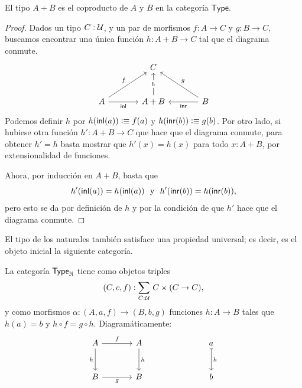 \documentclass[../main.tex]{subfiles}
\begin{document}
\begin{theorem}
  El tipo $A + B$ es el coproducto de $A$ y $B$ en la categor\'ia $\mathsf{Type}$.
\end{theorem}
\begin{proof}
  Dados un tipo $C:\mathcal{U}$, y un par de morfismos $f:A \to C$ y $g:B \to C$, buscamos encontrar una \'unica funci\'on $h: A + B \to C$ tal que el diagrama conmute.
  \[\begin{tikzcd}[row sep=large,column sep=large]
      & C \\
      A & {A+B} & B
      \arrow["f", from=2-1, to=1-2]
      \arrow["{\inl}"', from=2-1, to=2-2]
      \arrow["g"', from=2-3, to=1-2]
      \arrow["\inr", from=2-3, to=2-2]
      \arrow["h"{description}, from=2-2, to=1-2]
    \end{tikzcd}\]
  Podemos definir $h$ por $h({\mathsf{inl}}(a))\vcentcolon\equiv f(a)$ y $h({\mathsf{inr}}(b))\vcentcolon\equiv g(b)$.
  Por otro lado, si hubiese otra funci\'on $h': A + B \to C$ que hace que el diagrama conmute, para obtener $h'=h$ basta mostrar que $h'(x) = h(x)$ para todo $x:A+B$, por extensionalidad de funciones.

  Ahora, por inducci\'on en $A+B$, basta que
  \[ h'({\mathsf{inl}}(a)) = h({\mathsf{inl}}(a)) \,\, \text{ y } \,\, h'({\mathsf{inr}}(b)) = h({\mathsf{inr}}(b)), \]
  pero esto se da por definici\'on de $h$ y por la condici\'on de que $h'$ hace que el diagrama conmute.
\end{proof}

El tipo de los naturales tambi\'en satisface una propiedad universal; es decir, es el objeto inicial la siguiente categor\'ia.

\begin{definition}
  La categor\'ia $\mathsf{Type}_\mathbb{N}$ tiene como objetos triples
  \[(C,c,f):\sm{C:\UU}C \times (C \to C),\]
  y como morfismos $\alpha:(A,a,f) \to (B,b,g)$ funciones $h : A \to B$ tales que $h(a)=b$ y $h \circ f = g \circ h$. Diagram\'aticamente:
  \[\begin{tikzcd}[row sep=large,column sep=large]
      A & A && a \\
      B & B && b
      \arrow["f", from=1-1, to=1-2]
      \arrow["h"', from=1-1, to=2-1]
      \arrow["h", from=1-2, to=2-2]
      \arrow["g"', from=2-1, to=2-2]
      \arrow["h", maps to, from=1-4, to=2-4]
    \end{tikzcd}\]
\end{definition}
\end{document}

